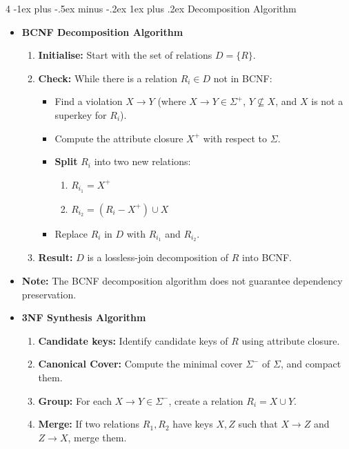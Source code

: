 \documentclass[10pt, landscape]{article}
\makeatletter
\renewcommand{\subsubsection}{\@startsection{subsubsection}{3}{0mm}%
  {-1ex plus -.5ex minus -.2ex}%
  {1ex plus .2ex}%
{\normalfont\small\bfseries}}%
\makeatother
\begin{document}
\begin{multicols*}{4}
  \subsubsection{Decomposition Algorithm}
  \begin{itemize}  
    \item \textbf{BCNF Decomposition Algorithm}
    \begin{enumerate}
        \item \textbf{Initialise:} Start with the set of relations $D = \{R\}$.
        \item \textbf{Check:} While there is a relation $R_i \in D$ not in BCNF:
        \begin{itemize}
            \item Find a violation $X \to Y$ (where $X \to Y \in \Sigma^+$, $Y \not\subseteq X$, and $X$ is not a superkey for $R_i$).
            \item Compute the attribute closure $X^+$ with respect to $\Sigma$.
            \item \textbf{Split} $R_i$ into two new relations:
            \begin{enumerate}
                \item $R_{i_1} = X^+$
                \item $R_{i_2} = (R_i - X^+) \cup X$
            \end{enumerate}
            \item Replace $R_i$ in $D$ with $R_{i_1}$ and $R_{i_2}$.
        \end{itemize}
        \item \textbf{Result:} $D$ is a lossless-join decomposition of $R$ into BCNF.
    \end{enumerate}
    \item \textbf{Note:} The BCNF decomposition algorithm does not guarantee dependency preservation.\\
    \item \textbf{3NF Synthesis Algorithm}
    \begin{enumerate}
        \item \textbf{Candidate keys:} Identify candidate keys of $R$ using attribute closure.
        \item \textbf{Canonical Cover:} Compute the minimal cover $\Sigma^-$ of $\Sigma$, and compact them.
        \item \textbf{Group:} For each $X \to Y \in \Sigma^-$, create a relation $R_i = X \cup Y$.
        \item \textbf{Merge:} If two relations $R_1, R_2$ have keys $X, Z$ such that $X \to Z$ and $Z \to X$, merge them.

\end{enumerate}
\end{itemize}
\end{multicols*}
\end{document}

